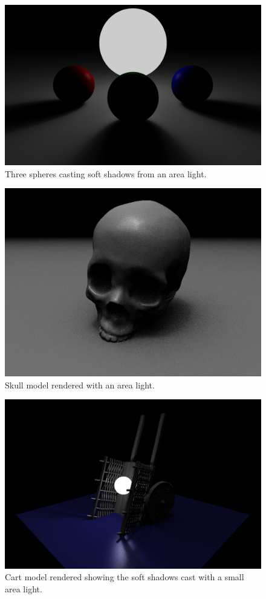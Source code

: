 \documentclass{acmsiggraph}                     %
\begin{document}
\begin{figure}[ht]
    \centering
    \includegraphics[width=6in]{spheres.jpg}
    \caption{Three spheres casting soft shadows from an area light.}
    \label{fig:spheres}
\end{figure}

\begin{figure}[ht]
    \centering
    \includegraphics[width=6in]{skull.png}
    \caption{Skull model rendered with an area light.}
    \label{fig:skull}
\end{figure}

\begin{figure}[ht]
    \centering
    \includegraphics[width=6in]{cartblue.png}
    \caption{Cart model rendered showing the soft shadows cast with a small area light.}
    \label{fig:cartblue}
\end{figure}


\nocite{*}

\end{document}

